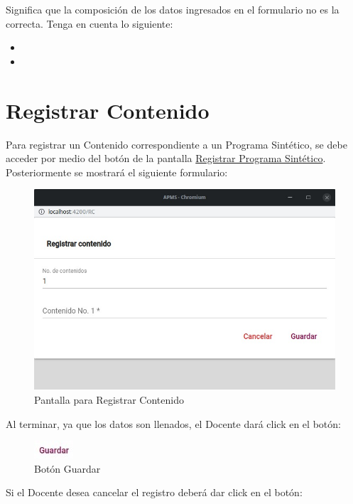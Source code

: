 \documentclass[10pt]{book}
\begin{document}
\begin{itemize}
        Significa que la composición de los datos ingresados en el formulario no es la correcta. Tenga en cuenta lo siguiente:

        \begin{itemize}
            \item 
            \item 
                            
        \end{itemize}

    \end{itemize}
    
\pagebreak
\hypertarget{Registrar Contenido}{\section{Registrar Contenido}}

Para registrar un Contenido correspondiente a un Programa Sintético, se debe acceder por medio del botón  de la pantalla \hyperlink{RegistrarPS}{Registrar Programa Sintético}. Posteriormente se mostrará el siguiente formulario: 


\begin{figure}[!hbtp]
    \centering
    \hypertarget{RegistrarContenido}{\includegraphics[width=0.5\linewidth]{images/SP6/11.jpeg}}
    \caption{Pantalla para Registrar Contenido}
\end{figure}

Al terminar, ya que los datos son llenados, el Docente dará click en el botón:

\begin{figure}[!hbtp]
    \centering
    \includegraphics[width=0.1\linewidth]{images/SP6/BotonGuardar.jpeg}
    \caption{Botón Guardar} 
\end{figure}

Si el Docente desea cancelar el registro deberá dar click en el botón:
\end{document}
